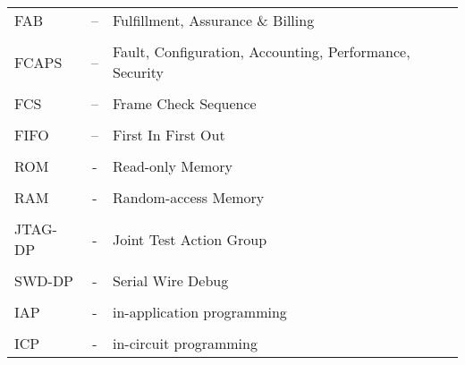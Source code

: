 \begin{tabular}{ l c l }
	\\
	FAB & – \hspace{1cm} & Fulfillment, Assurance \& Billing \\
	\\
	FCAPS & – \hspace{1cm} & Fault, Configuration, Accounting, Performance, Security \\
	\\
	FCS & – \hspace{1cm} & Frame Check Sequence \\
	\\
	FIFO & – \hspace{1cm} & First In First Out \\
	\\
	ROM & - \hspace{1cm} & Read-only Memory \\
	\\
	RAM & - \hspace{1cm} & Random-access Memory \\
	\\
	JTAG-DP & - \hspace{1cm} & Joint Test Action Group \\
	\\
	SWD-DP & - \hspace{1cm} & Serial Wire Debug \\
	\\
	IAP & - \hspace{1cm} & in-application programming \\
	\\
	ICP & - \hspace{1cm} & in-circuit programming \\
\end{tabular}
